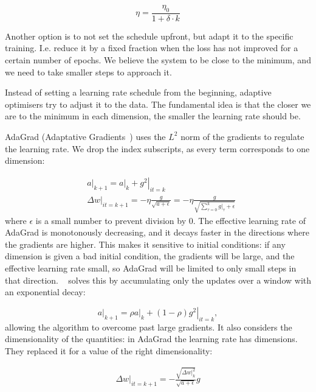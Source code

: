 \begin{equation}
\eta= \frac{\eta_0}{1 + \delta \cdot k}
\end{equation}

Another option is to not set the schedule upfront, but adapt it to the specific training.
I.e. reduce it by a fixed fraction when the loss has not improved for a certain number of epochs.
We believe the system to be close to the minimum, and we need to take smaller steps to approach it.

Instead of setting a learning rate schedule from the beginning, adaptive optimisers try to adjust it to the data.
The fundamental idea is that the closer we are to the minimum in each dimension, the smaller the learning rate should be.

AdaGrad (Adaptative Gradients~\citep{adagrad}) uses the $L^2$ norm of the gradients to regulate the learning rate.
We drop the index subscripts, as every term corresponds to one dimension:

\begin{align*}
&\left.a\right|_{k+1} = \left. a\right|_{k} + \left.g^2\right|_{it=k}\\
&\left.\Delta w\right|_{it=k+1} = - \eta\frac{g}{\sqrt{a + \epsilon}} =  - \eta\frac{g}{\sqrt{\sum_{\tau=0}^{k} \left.g\right|_\tau + \epsilon}}
\end{align*}
where $\epsilon$ is a small number to prevent division by 0.
The effective learning rate of AdaGrad is monotonously decreasing, and it decays faster in the directions where the gradients are higher.
This makes it sensitive to initial conditions: if any dimension is given a bad initial condition, the gradients will be large, and the effective learning rate small, so AdaGrad will be limited to only small steps in that direction.
\ADADELTA~\citep{adadelta} solves this by accumulating only the updates over a window with an exponential decay:

\begin{equation*}
\left.a\right|_{k+1} = \rho \left. a\right|_{k} + (1-\rho) \left.g^2\right|_{it=k},
\end{equation*}
allowing the algorithm to overcome past large gradients.
It also considers the dimensionality of the quantities: in AdaGrad the learning rate has dimensions.
They replaced it for a value of the right dimensionality:

\begin{align*}
\left.\Delta w\right|_{it=k+1} = - \frac{\sqrt{\left.\Delta w\right|_{k}^2}}{\sqrt{a + \epsilon}}g 
\end{align*}

